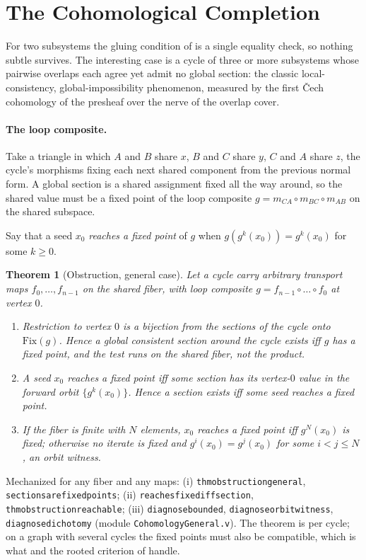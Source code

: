 \documentclass[11pt,a4paper]{article}
\theoremstyle{plain}
\newtheorem{theorem}{Theorem}[section]
\theoremstyle{definition}
\theoremstyle{remark}
\renewcommand{\_}{\origunderscore\allowbreak}
\begin{document}
\section{The Cohomological Completion}
\label{sec:completion}

For two subsystems the gluing condition of  is a single equality check, so nothing
subtle survives. The interesting case is a cycle of three or more subsystems whose pairwise overlaps
each agree yet admit no global section: the classic local-consistency, global-impossibility
phenomenon, measured by the first \v{C}ech cohomology of the presheaf over the nerve of the overlap
cover.

\paragraph{The loop composite.} Take a triangle in which $A$ and $B$ share $x$, $B$ and $C$ share
$y$, $C$ and $A$ share $z$, the cycle's morphisms fixing each next shared component from the previous
normal form. A global section is a shared assignment fixed all the way around, so the shared value
must be a fixed point of the loop composite $g = m_{CA} \circ m_{BC} \circ m_{AB}$ on the shared
subspace.

Say that a seed $x_0$ \emph{reaches a fixed point} of $g$ when $g(g^k(x_0)) = g^k(x_0)$ for some
$k \ge 0$.

\begin{theorem}[Obstruction, general case]
\label{thm:obstruction}
Let a cycle carry arbitrary transport maps $f_0, \dots, f_{n-1}$ on the shared fiber, with loop
composite $g = f_{n-1} \circ \dots \circ f_0$ at vertex $0$.
\begin{enumerate}[label=(\roman*)]
\item Restriction to vertex $0$ is a bijection from the sections of the cycle onto
  $\mathrm{Fix}(g)$. Hence a global consistent section around the cycle exists iff $g$ has a fixed
  point, and the test runs on the shared fiber, not the product.
\item A seed $x_0$ reaches a fixed point iff some section has its vertex-$0$ value in the forward
  orbit $\{g^k(x_0)\}$. Hence a section exists iff some seed reaches a fixed point.
\item If the fiber is finite with $N$ elements, $x_0$ reaches a fixed point iff $g^N(x_0)$ is fixed;
  otherwise no iterate is fixed and $g^i(x_0) = g^j(x_0)$ for some $i < j \le N$, an orbit witness.
\end{enumerate}
\end{theorem}
\noindent Mechanized for any fiber and any maps: (i) \texttt{thm\_obstruction\_general},
\texttt{sections\_are\_fixed\_points}; (ii) \texttt{reaches\_fixed\_iff\_section},
\texttt{thm\_obstruction\_reachable}; (iii) \texttt{diagnose\_bounded},
\texttt{diagnose\_orbit\_witness}, \texttt{diagnose\_dichotomy} (module
\texttt{CohomologyGeneral.v}). The theorem is per cycle; on a graph with several cycles the fixed
points must also be compatible, which is what  and the rooted criterion of
 handle.
\end{document}
